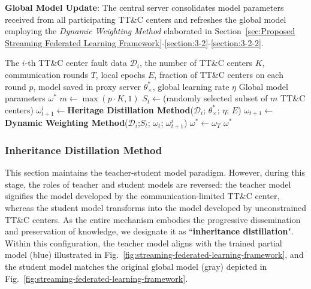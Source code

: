 \textbf{Global Model Update}: The central server consolidates model parameters received from all participating TT\&C centers 
and refreshes the global model employing the \textit{Dynamic Weighting Method} elaborated in Section~\ref{sec:Proposed Streaming Federated Learning Framework}-\ref{section:3-2}-\ref{section:3-2-2}.

\begin{algorithm}[t]
	\caption{FL-PFC Algorithm}
	\label{Alg:FL-LFC}
	\begin{algorithmic}[1]
		\REQUIRE The $i$-th TT\&C center fault data ${{\mathscr D}_{i}}$, the number of TT\&C centers $K$, communication rounds $T$, local epochs $E$, fraction of TT\&C centers on each round $p$, model saved in proxy server $\theta _ \times ^ * $, global learning rate $\eta $
		\ENSURE Global model parameters ${\omega ^ * }$
		\STATE $m \leftarrow \max \left( {p \cdot K,1} \right)$
		\STATE ${S_t} \leftarrow $(randomly selected subset of $m$ TT\&C centers)
		\STATE $\omega _{t+1}^i \leftarrow $\textbf{Heritage Distillation Method}(${{\mathscr D}_{i}}$; $\theta _ \times ^ * $; ${\eta}$; $E$)
		\ENDFOR
		\STATE ${\omega _{t + 1}} \leftarrow $\textbf{Dynamic Weighting Method}(${{\mathscr D}_{i}}$;${S_t}$; $\omega _{t}$; $\omega _{t+1}^i$)
		\ENDFOR
		\STATE ${\omega ^ * } \leftarrow {\omega _T}$
		\RETURN ${\omega ^ * }$
	\end{algorithmic}
\end{algorithm}

\subsubsection{Inheritance Distillation Method}
\label{section:3-2-1}
This section maintains the teacher-student model paradigm. 
However, during this stage, the roles of teacher and student models are reversed: 
the teacher model signifies the model developed by the communication-limited TT\&C center,
whereas the student model transforms into the model developed by unconstrained TT\&C centers. 
As the entire mechanism embodies the progressive dissemination and preservation of knowledge, 
we designate it as ``\textbf{inheritance distillation}". 
Within this configuration, the teacher model aligns with the trained partial model (blue) illustrated in Fig.~\ref{fig:streaming-federated-learning-framework}, 
and the student model matches the original global model (gray) depicted in Fig.~\ref{fig:streaming-federated-learning-framework}.

